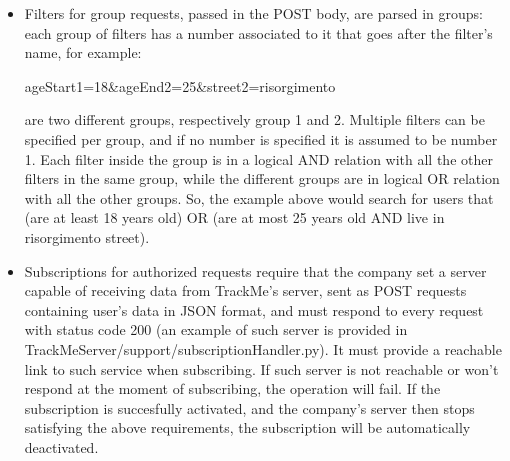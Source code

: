 \documentclass[../main.tex]{subfiles}
\begin{document}
\begin{itemize}

	\item Filters for group requests, passed in the POST body, are parsed in groups: each group of filters has a number associated to it that goes after the filter's name, for example:

	 ageStart1=18\&ageEnd2=25\&street2=risorgimento

	 are two different groups, respectively group 1 and 2. Multiple filters can be specified per group, and if no number is specified it is assumed to be number 1. Each filter inside the group is in a logical AND relation with all the other filters in the same group, while the different groups are in logical OR relation with all the other groups. So, the example above would search for users that (are at least 18 years old) OR (are at most 25 years old AND live in risorgimento street).
	\item Subscriptions for authorized requests require that the company set a server capable of receiving data from TrackMe's server, sent as POST requests containing user's data in JSON format, and must respond to every request with status code 200 (an example of such server is provided in TrackMeServer/support/subscriptionHandler.py). It must provide a reachable link to such service when subscribing. If such server is not reachable or won't respond at the moment of subscribing, the operation will fail. If the subscription is succesfully activated, and the company's server then stops satisfying the above requirements, the subscription will be automatically deactivated.

\end{itemize}
\end{document}
